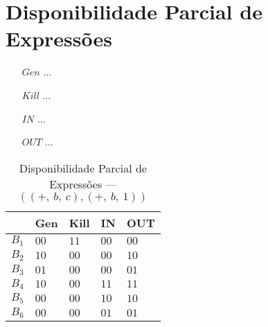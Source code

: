 \section{Disponibilidade Parcial de Express\~oes}

\begin{itemize}
  \item[$Gen$] ...
  \item[$Kill$] ...
  \item[$IN$] ...
  \item[$OUT$] ...
\end{itemize}

\begin{table}[ht]
\centering
\begin{tabular}{l|l|l|l|l}
	& Gen & Kill & IN & OUT\\
\hline
$B_{1}$ &  $00$ & $11$ & $00$ & $00$\\
$B_{2}$ &  $10$ & $00$ & $00$ & $10$\\
$B_{3}$ &  $01$ & $00$ & $00$ & $01$\\
$B_{4}$ &  $10$ & $00$ & $11$ & $11$\\
$B_{5}$ &  $00$ & $00$ & $10$ & $10$\\
$B_{6}$ &  $00$ & $00$ & $01$ & $01$\\
\end{tabular}
\caption{Disponibilidade Parcial de Express\~oes --- $((+,\:b,\:c), (+,\:b,\:1))$}
\end{table}

